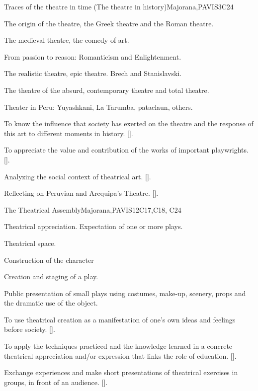 \begin{syllabus}
\begin{unit}{}{Traces of the theatre in time (The theatre in history)}{Majorana,PAVIS}{3}{C24}
\begin{topics}
	\item The origin of the theatre, the Greek theatre and the Roman theatre.
	\item The medieval theatre, the comedy of art.
	\item From passion to reason: Romanticism and Enlightenment.
	\item The realistic theatre, epic theatre. Brech and Stanislavski.
	\item The theatre of the absurd, contemporary theatre and total theatre.
	\item Theater in Peru: Yuyashkani, La Tarumba, pataclaun, others.
\end{topics}
\begin{learningoutcomes}
	\item To know the influence that society has exerted on the theatre and the response of this art to different moments in history. [\Usage].
	\item To appreciate the value and contribution of the works of important playwrights. [\Usage].
	\item Analyzing the social context of theatrical art. [\Usage].
	\item Reflecting on Peruvian and Arequipa's Theatre. [\Usage].
\end{learningoutcomes}
\end{unit}

\begin{unit}{}{The Theatrical Assembly}{Majorana,PAVIS}{12}{C17,C18, C24}
\begin{topics}
	\item Theatrical appreciation. Expectation of one or more plays.
	\item Theatrical space.
	\item Construction of the character
	\item Creation and staging of a play.
	\item Public presentation of small plays using costumes, make-up, scenery, props and the dramatic use of the object.
\end{topics}
\begin{learningoutcomes}
	\item To use theatrical creation as a manifestation of one's own ideas and feelings before society. [\Usage].
	\item To apply the techniques practiced and the knowledge learned in a concrete theatrical appreciation and/or expression that links the role of education. [\Usage].
	\item Exchange experiences and make short presentations of theatrical exercises in groups, in front of an audience. [\Usage].
\end{learningoutcomes}
\end{unit}

\begin{coursebibliography}
\end{coursebibliography}

\end{syllabus}
